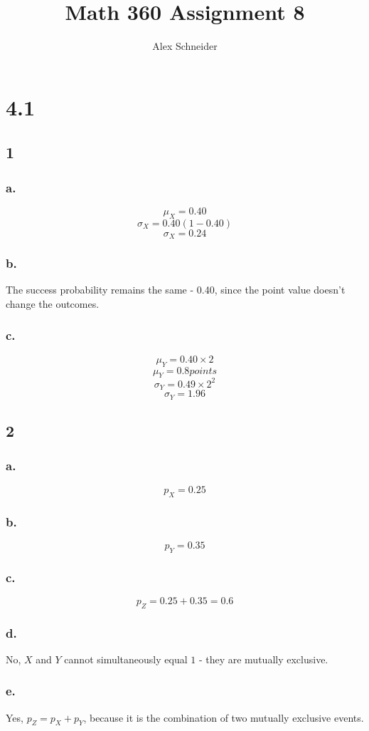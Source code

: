 \documentclass[11pt]{article}
\title{Math 360 Assignment 8}
\author{Alex Schneider}
\begin{document}
\maketitle
\section{4.1}
\subsection{1}
\subsubsection{a.}
\[\mu_X = 0.40 \]
\[\sigma_X = 0.40(1-0.40) \]
\[\sigma_X = 0.24 \]
\subsubsection{b.}
The success probability remains the same - 0.40, since the point value doesn't
change the outcomes. 

\subsubsection{c.}
\[ \mu_Y = 0.40 \times 2 \]
\[ \mu_Y = 0.8 points \]
\[ \sigma_Y = 0.49 \times 2^2 \]
\[ \sigma_Y = 1.96 \]

\subsection{2}
\subsubsection{a.}
\[ p_X = 0.25 \]
\subsubsection{b.}
\[ p_Y = 0.35 \]
\subsubsection{c.}
\[ p_Z = 0.25 + 0.35 = 0.6 \]
\subsubsection{d.}
No, $X$ and $Y$ cannot simultaneously equal $1$ - they are mutually exclusive.
\subsubsection{e.}
Yes, $p_Z = p_X + p_Y$, because it is the combination of two mutually exclusive
events.
\end{document}
